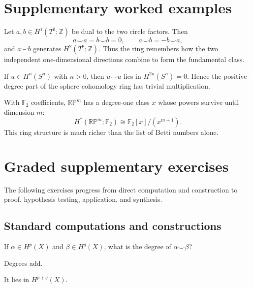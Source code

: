 \section{Supplementary worked examples}
\label{sec:viii29-pedagogy}

\begin{example}\label{ex:viii29-ped-01}
Let $a,b\in H^1(T^2;\mathbb Z)$ be dual to the two circle factors. Then
\[
a\smile a=b\smile b=0,\qquad a\smile b=-b\smile a,
\]
and $a\smile b$ generates $H^2(T^2;\mathbb Z)$. Thus the ring remembers how the two independent one-dimensional directions combine to form the fundamental class.
\end{example}

\begin{example}\label{ex:viii29-ped-02}
If $u\in H^n(S^n)$ with $n>0$, then $u\smile u$ lies in $H^{2n}(S^n)=0$. Hence the positive-degree part of the sphere cohomology ring has trivial multiplication.
\end{example}

\begin{example}\label{ex:viii29-ped-03}
With $\mathbb F_2$ coefficients, $\mathbb{RP}^m$ has a degree-one class $x$ whose powers survive until dimension $m$:
\[
H^*(\mathbb{RP}^m;\mathbb F_2)\cong \mathbb F_2[x]/(x^{m+1}).
\]
This ring structure is much richer than the list of Betti numbers alone.
\end{example}

\section{Graded supplementary exercises}
The following exercises progress from direct computation and construction to proof, hypothesis testing, application, and synthesis.

\subsection*{Standard computations and constructions}

\begin{exercise}\label{exr:viii29-ped-01}
If $\alpha\in H^p(X)$ and $\beta\in H^q(X)$, what is the degree of $\alpha\smile\beta$?
\end{exercise}
\begin{hint}
Degrees add.
\end{hint}
\begin{solution}
It lies in $H^{p+q}(X)$.
\end{solution}

